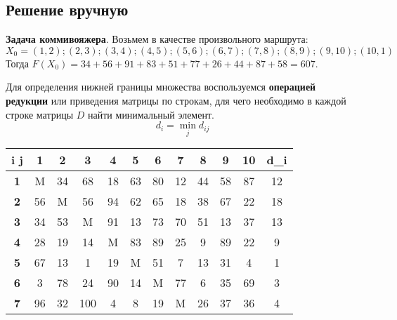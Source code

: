 \documentclass[17pt]{extarticle}
\begin{document}
\clearpage


\subsection*{Решение вручную}

\textbf{Задача коммивояжера}.
Возьмем в качестве произвольного маршрута:
\[ X_0 = (1,2);(2,3);(3,4);(4,5);(5,6);(6,7);(7,8);(8,9);(9,10);(10,1) \]
Тогда \( F(X_0) = 34 + 56 + 91 + 83 + 51 + 77 + 26 + 44 + 87 + 58 = 607 \).

Для определения нижней границы множества воспользуемся \textbf{операцией редукции} или приведения матрицы по строкам, для чего необходимо в каждой строке матрицы \( D \) найти минимальный элемент.
\[ d_i = \min_j d_{ij} \]

\begin{table}[H]
    \centering
    \begin{tabular}{|c|c|c|c|c|c|c|c|c|c|c|c|}
        \hline
        \textbf{i j} & \bfseries 1 & \bfseries 2 & \bfseries 3 & \bfseries 4 & \bfseries 5 & \bfseries 6 & \bfseries 7 & \bfseries 8 & \bfseries 9 & \bfseries 10 & \bfseries d_i \\ \hline\textbf{1}   & M          & 34         & 68         & 18         & 63         & 80         & 12         & 44         & 58         & 87          & 12          \\ \hline
        \textbf{2}   & 56          & M           & 56          & 94          & 62          & 65          & 18          & 38          & 67          & 22           & 18            \\ \hline
        \textbf{3}   & 34          & 53          & M           & 91          & 13          & 73          & 70          & 51          & 13          & 37           & 13            \\ \hline
        \textbf{4}   & 28          & 19          & 14          & M           & 83          & 89          & 25          & 9           & 89          & 22           & 9             \\ \hline
        \textbf{5}   & 67          & 13          & 1           & 19          & M           & 51          & 7           & 13          & 31          & 4            & 1             \\ \hline
        \textbf{6}   & 3           & 78          & 24          & 90          & 14          & M           & 77          & 6           & 35          & 69           & 3             \\ \hline
        \textbf{7}   & 96          & 32          & 100         & 4           & 8           & 19          & M           & 26          & 37          & 36           & 4             \\ \hline

\end{tabular}
\end{table}
\end{document}
